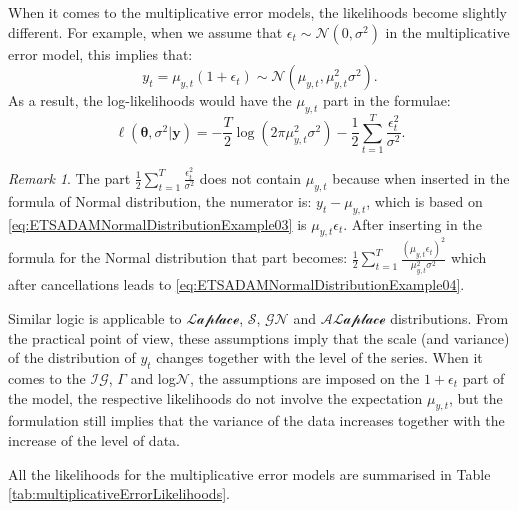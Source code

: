 \documentclass[
]{book}
\theoremstyle{definition}
\theoremstyle{definition}
\theoremstyle{definition}
\theoremstyle{definition}
\theoremstyle{remark}
\newtheorem*{remark}{Remark}
\begin{document}
When it comes to the multiplicative error models, the likelihoods become slightly different. For example, when we assume that \(\epsilon_t \sim \mathcal{N}(0, \sigma^2)\) in the multiplicative error model, this implies that:
\begin{equation}
    y_t = \mu_{y,t}(1+\epsilon_t) \sim \mathcal{N}(\mu_{y,t}, \mu_{y,t}^2 \sigma^2) .
  \label{eq:ETSADAMNormalDistributionExample03}
\end{equation}
As a result, the log-likelihoods would have the \(\mu_{y,t}\) part in the formulae:
\begin{equation}
    \ell(\boldsymbol{\theta}, {\sigma}^2 | \mathbf{y}) = -\frac{T}{2} \log(2 \pi \mu_{y,t}^2 \sigma^2) -\frac{1}{2} \sum_{t=1}^T \frac{\epsilon_t^2}{\sigma^2} .
  \label{eq:ETSADAMNormalDistributionExample04}
\end{equation}

\begin{remark}
The part \(\frac{1}{2} \sum_{t=1}^T \frac{\epsilon_t^2}{\sigma^2}\) does not contain \(\mu_{y,t}\) because when inserted in the formula of Normal distribution, the numerator is: \(y_t - \mu_{y,t}\), which is based on \eqref{eq:ETSADAMNormalDistributionExample03} is \(\mu_{y,t} \epsilon_t\). After inserting in the formula for the Normal distribution that part becomes: \(\frac{1}{2} \sum_{t=1}^T \frac{(\mu_{y,t} \epsilon_t)^2}{\mu_{y,t}^2\sigma^2}\) which after cancellations leads to \eqref{eq:ETSADAMNormalDistributionExample04}.
\end{remark}

Similar logic is applicable to \(\mathcal{Laplace}\), \(\mathcal{S}\), \(\mathcal{GN}\) and \(\mathcal{ALaplace}\) distributions. From the practical point of view, these assumptions imply that the scale (and variance) of the distribution of \(y_t\) changes together with the level of the series. When it comes to the \(\mathcal{IG}\), \(\Gamma\) and log\(\mathcal{N}\), the assumptions are imposed on the \(1+\epsilon_t\) part of the model, the respective likelihoods do not involve the expectation \(\mu_{y,t}\), but the formulation still implies that the variance of the data increases together with the increase of the level of data.

All the likelihoods for the multiplicative error models are summarised in Table \ref{tab:multiplicativeErrorLikelihoods}.
\end{document}
